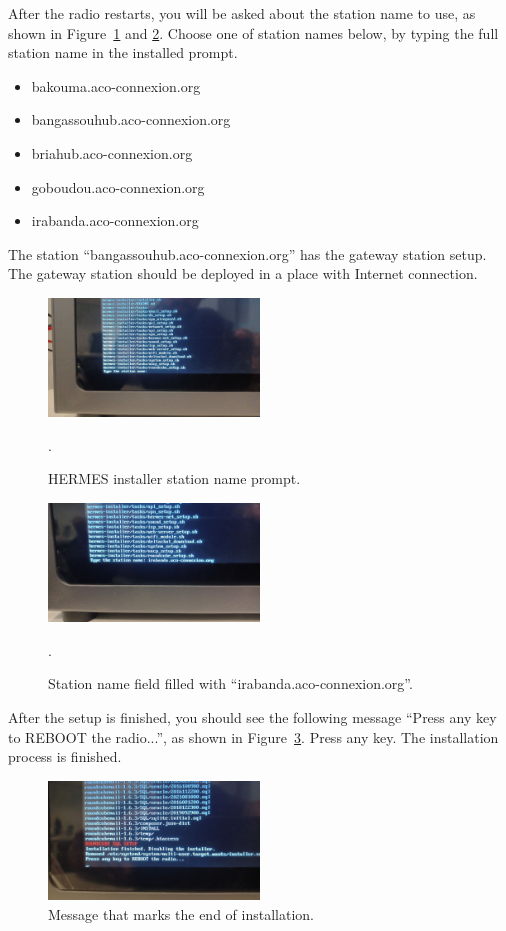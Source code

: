 \documentclass[11pt,a4paper]{article}
\begin{document}
After the radio restarts, you will be asked about the station name to use, as shown in Figure~\ref{fig:inst5} and \ref{fig:inst6}. Choose one of station
names below, by typing the full station name in the installed prompt.
\begin{itemize}
\item bakouma.aco-connexion.org
\item bangassouhub.aco-connexion.org
\item briahub.aco-connexion.org
\item goboudou.aco-connexion.org
\item irabanda.aco-connexion.org
\end{itemize}

The station ``bangassouhub.aco-connexion.org'' has the gateway station setup. The gateway station should be deployed
in a place with Internet connection.

\begin{figure}[H]
  \centering
  \includegraphics[width=0.5\textwidth]{pictures/inst-5.jpg}
  \caption{HERMES installer station name prompt.}.
  \label{fig:inst5}
\end{figure}

\begin{figure}[H]
  \centering
  \includegraphics[width=0.5\textwidth]{pictures/inst-6.jpg}
  \caption{Station name field filled with ``irabanda.aco-connexion.org''.}.
  \label{fig:inst6}
\end{figure}

After the setup is finished, you should see the following message ``Press any key to REBOOT the radio...'', as shown in Figure~\ref{fig:inst7}. Press any key. The installation process is finished.


\begin{figure}[H]
  \centering
  \includegraphics[width=0.5\textwidth]{pictures/inst-7.jpg}
  \caption{Message that marks the end of installation.}
  \label{fig:inst7}
\end{figure}
\end{document}
